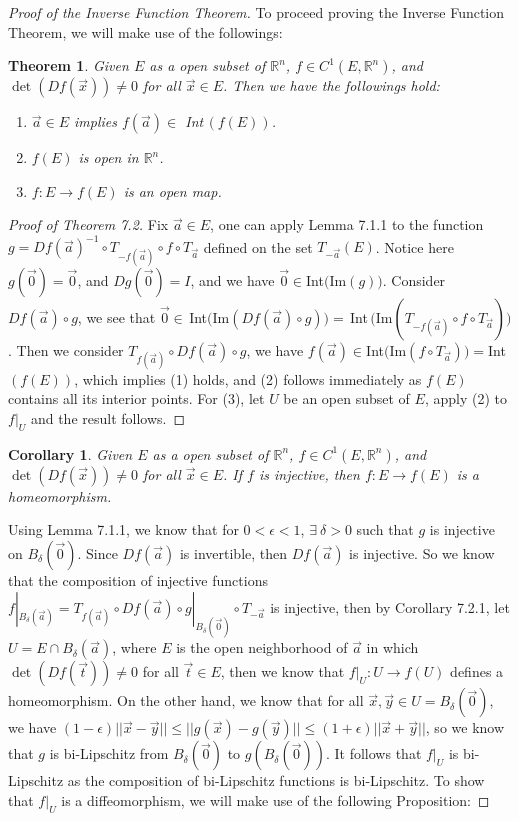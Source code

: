 \documentclass[15pt]{book}
\theoremstyle{break}
\theoremstyle{break}
\newtheorem{thm}{Theorem}[section]
\newtheorem{corT}[lem]{Corollary}
\newcommand{\R}{\mathbb{R}}
\begin{document}
\begin{proof}[Proof of the Inverse Function Theorem]
To proceed proving the Inverse Function Theorem, we will make use of the followings:

\begin{thm}
\setlength{\leftskip}{1cm} Given $E$ as a open subset of $\R^n$, $f \in C^1(E,\R^n)$, and $\det(Df(\vec{x})) \neq 0$ for all $\vec{x}\in E$. Then we have the followings hold:
\begin{enumerate}[topsep=3pt,itemsep=-1ex,partopsep=1ex,parsep=1ex,leftmargin=1.5cm]
\item $\vec{a}\in E$ implies $f(\vec{a}) \in $ Int\,$(f(E))$.
\item $f(E)$ is open in $\R^n$.
\item $f:E \to f(E)$ is an open map.
\end{enumerate}
\end{thm}

\begin{proof}[Proof of Theorem 7.2]
\setlength{\leftskip}{1cm} Fix $\vec{a}\in E$, one can apply Lemma 7.1.1 to the function $g = Df(\vec{a})^{-1} \circ T_{-f(\vec{a})}\circ f \circ T_{\vec{a}}$ defined on the set $T_{-\vec{a}}(E)$. Notice here $g(\vec{0}) = \vec{0}$, and $Dg(\vec{0}) = I$, and we have $\vec{0}\in $Int$($Im$(g))$. Consider $Df(\vec{a})\circ g$, we see that $\vec{0}\in $\,Int$($Im$(Df(\vec{a})\circ g))=$\,Int\,$($Im$(T_{-f(\vec{a})}\circ f\circ T_{\vec{a}}))$. Then we consider $T_{f(\vec{a})}\circ Df(\vec{a})\circ g$, we have $f(\vec{a})\in$Int$($Im$(f\circ T_{\vec{a}}))=$Int$(f(E))$, which implies (1) holds, and (2) follows immediately as $f(E)$ contains all its interior points. For (3), let $U$ be an open subset of $E$, apply (2) to $f|_U$ and the result follows.
\end{proof}

\begin{corT}
\setlength{\leftskip}{1cm} Given $E$ as a open subset of $\R^n$, $f \in C^1(E,\R^n)$, and $\det(Df(\vec{x})) \neq 0$ for all $\vec{x}\in E$. If $f$ is injective, then $f:E \to f(E)$ is a homeomorphism.
\end{corT}


Using Lemma 7.1.1, we know that for $0<\epsilon<1$, $\exists\ \delta>0$ such that $g$ is injective on $B_{\delta}(\vec{0})$. Since $Df(\vec{a})$ is invertible, then $Df(\vec{a})$ is injective. So we know that the composition of injective functions $f|_{B_{\delta}(\vec{a})}=T_{f(\vec{a})} \circ Df(\vec{a}) \circ g|_{B_{\delta}(\vec{0})} \circ T_{-\vec{a}}$ is injective, then by Corollary 7.2.1, let $U = E \cap B_{\delta}(\vec{a})$, where $E$ is the open neighborhood of $\vec{a}$ in which $\det(Df(\vec{t})) \neq 0$ for all $\vec{t}\in E$, then we know that $f|_U: U\to f(U)$ defines a homeomorphism. On the other hand, we know that for all $\vec{x},\vec{y} \in U = B_\delta(\vec{0})$, we have $(1-\epsilon)||\vec{x}-\vec{y}|| \leq ||g(\vec{x}) - g(\vec{y}) || \leq (1+\epsilon) ||\vec{x}+\vec{y}||$, so we know that $g$ is bi-Lipschitz from $B_{\delta}(\vec{0})$ to $g(B_{\delta}(\vec{0}))$. It follows that $f|_U$ is bi-Lipschitz as the composition of bi-Lipschitz functions is bi-Lipschitz. To show that $f|_U$ is a diffeomorphism, we will make use of the following Proposition:



\end{proof}
\end{document}
